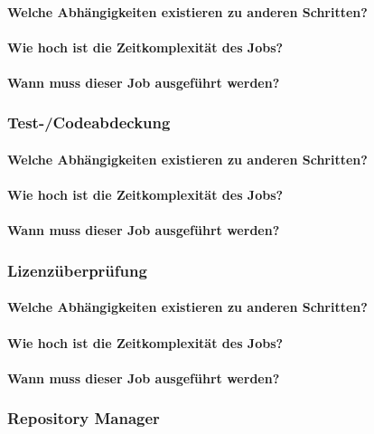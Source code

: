 \paragraph{Welche Abhängigkeiten existieren zu anderen Schritten?}
\paragraph{Wie hoch ist die Zeitkomplexität des Jobs?}
\paragraph{Wann muss dieser Job ausgeführt werden?}

\subsubsection{Test-/Codeabdeckung}
\paragraph{Welche Abhängigkeiten existieren zu anderen Schritten?}
\paragraph{Wie hoch ist die Zeitkomplexität des Jobs?}
\paragraph{Wann muss dieser Job ausgeführt werden?}

\subsubsection{Lizenzüberprüfung}
\paragraph{Welche Abhängigkeiten existieren zu anderen Schritten?}
\paragraph{Wie hoch ist die Zeitkomplexität des Jobs?}
\paragraph{Wann muss dieser Job ausgeführt werden?}

\subsubsection{Repository Manager}
